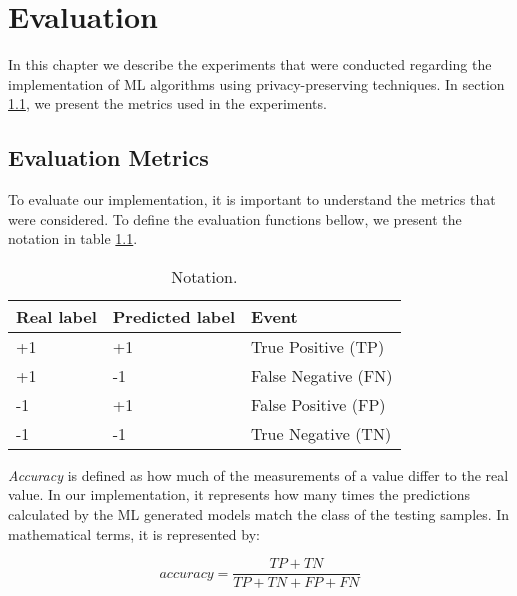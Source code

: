 %

\acresetall

\chapter{Evaluation}
\label{ch:Evaluation}

In this chapter we describe the experiments that were conducted regarding the implementation of \ac{ML} algorithms using privacy-preserving techniques. In section \ref{sec:EvaluationMetrics}, we present the metrics used in the experiments.



\section{Evaluation Metrics}
\label{sec:EvaluationMetrics}

To evaluate our implementation, it is important to understand the metrics that were considered. To define the evaluation functions bellow, we present the notation in table \ref{table:notation}. 

\begin{table}[H]
\centering
\caption{Notation.}
\label{table:notation}
\begin{tabular}{|l|l|l|}
\hline
\textbf{Real label} & \textbf{Predicted label} & \textbf{Event} \\ \hline
 +1  &  +1  & True Positive (TP)   \\ \hline
 +1  &  -1  & False Negative (FN)  \\ \hline
 -1  &  +1  & False Positive (FP)  \\ \hline
 -1  &  -1  & True Negative (TN)   \\ \hline 
\end{tabular}
\end{table}

\textit{Accuracy} is defined as how much of the measurements of a value differ to the real value. In our implementation, it represents how many times the predictions calculated by the \ac{ML} generated models match the class of the testing samples. In mathematical terms, it is represented by:

\begin{equation}
\label{eq:accuracy}
accuracy=\frac{TP + TN} {TP + TN + FP + FN} 
\end{equation}


